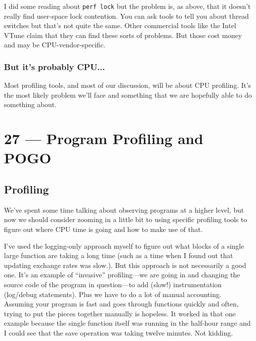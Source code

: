 \documentclass[a4paper]{report}
\begin{document}
I did some reading about \texttt{perf lock} but the problem is, as above, that it doesn't really find user-space lock contention. You can ask tools to tell you about thread switches but that's not quite the same. Other commercial tools like the Intel VTune claim that they can find these sorts of problems. But those cost money and may be CPU-vendor-specific.


\subsection*{But it's probably CPU...}
Most profiling tools, and most of our discussion, will be about CPU profiling. It's the most likely problem we'll face and something that we are hopefully able to do something about. 









\chapter*{27 --- Program Profiling and POGO}


\section*{Profiling}
We've spent some time talking about observing programs at a higher level, but now we should consider zooming in a little bit to using specific profiling tools to figure out where CPU time is going and how to make use of that.

I've used the logging-only approach myself to figure out what blocks of a single large function are taking a long time (such as a time when I found out that updating exchange rates was slow.). But this approach is not necessarily a good one.  It's an example of ``invasive'' profiling---we are going in and changing the source code of the program in question---to add (slow!) instrumentation (log/debug statements). Plus we have to do a lot of manual accounting. Assuming your program is fast and goes through functions quickly and often, trying to put the pieces together manually is hopeless. It worked in that one example because the single function itself was running in the half-hour range and I could see that the save operation was taking twelve minutes. Not kidding.
\end{document}
